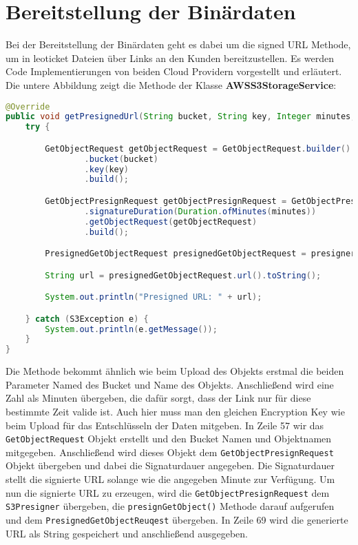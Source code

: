 \newpage

\section{Bereitstellung der Binärdaten}

Bei der Bereitstellung der Binärdaten geht es dabei um die signed URL Methode, um in leoticket Dateien über Links an den Kunden bereitzustellen. Es werden Code Implementierungen von beiden Cloud Providern vorgestellt und erläutert.\\

Die untere Abbildung zeigt die Methode der Klasse \textbf{AWSS3StorageService}:

\begin{lstlisting}[language=Java, caption=Prototyp Code Snippet - Generierung eines signierten URLs durch AWS]
@Override
public void getPresignedUrl(String bucket, String key, Integer minutes, String encryptionKey) {
    try {

        GetObjectRequest getObjectRequest = GetObjectRequest.builder()
                .bucket(bucket)
                .key(key)
                .build();

        GetObjectPresignRequest getObjectPresignRequest = GetObjectPresignRequest.builder()
                .signatureDuration(Duration.ofMinutes(minutes))
                .getObjectRequest(getObjectRequest)
                .build();

        PresignedGetObjectRequest presignedGetObjectRequest = presigner.presignGetObject(getObjectPresignRequest);

        String url = presignedGetObjectRequest.url().toString();

        System.out.println("Presigned URL: " + url);

    } catch (S3Exception e) {
        System.out.println(e.getMessage());
    }
}
\end{lstlisting}

Die Methode bekommt ähnlich wie beim Upload des Objekts erstmal die beiden Parameter Named des Bucket und Name des Objekts. Anschließend wird eine Zahl als Minuten übergeben, die dafür sorgt, dass der Link nur für diese bestimmte Zeit valide ist. Auch hier muss man den gleichen Encryption Key wie beim Upload für das Entschlüsseln der Daten mitgeben. In Zeile 57 wir das \verb|GetObjectRequest| Objekt erstellt und den Bucket Namen und Objektnamen mitgegeben. Anschließend wird dieses Objekt dem \verb|GetObjectPresignRequest| Objekt übergeben und dabei die Signaturdauer angegeben. Die Signaturdauer stellt die signierte URL solange wie die angegeben Minute zur Verfügung. Um nun die signierte URL zu erzeugen, wird die \verb|GetObjectPresignRequest| dem \verb|S3Presigner| übergeben, die \verb|presignGetObject()| Methode darauf aufgerufen und dem \verb|PresignedGetObjectReuqest| übergeben. In Zeile 69 wird die generierte URL als String gespeichert und anschließend ausgegeben.

